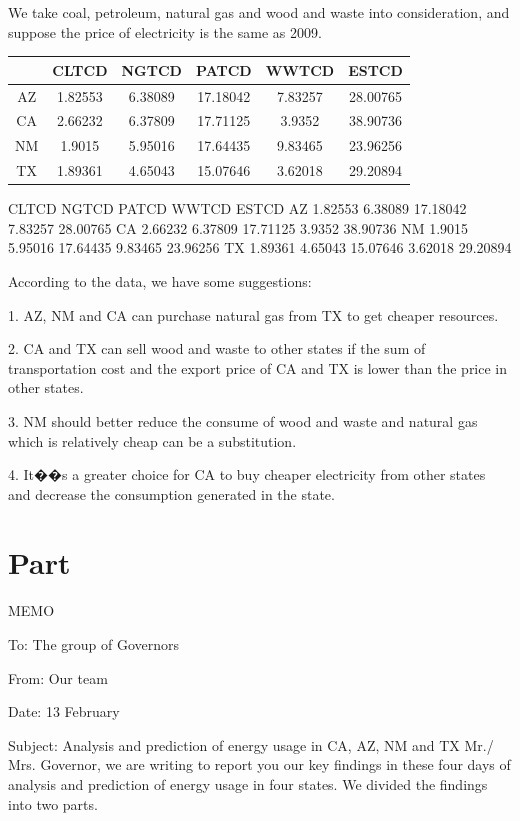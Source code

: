 \documentclass[12pt]{article}
\begin{document}
We take coal, petroleum, natural gas and wood and waste into consideration, and suppose the price of electricity is the same as 2009.


\begin{table}[!h]\centering
\begin{tabular}{|c|c|c|c|c| c|}
\hline
	&CLTCD&	NGTCD&	PATCD&	WWTCD&	ESTCD\\
\hline
AZ&	1.82553&	6.38089&	17.18042&	7.83257&	28.00765\\
\hline
CA	&2.66232&	6.37809&	17.71125&	3.9352&	38.90736\\
\hline
NM&	1.9015&	5.95016&	17.64435&	9.83465&	23.96256\\
\hline
TX&	1.89361&	4.65043&	15.07646&	3.62018&	29.20894\\

\hline
\end{tabular}
\end{table}

	CLTCD	NGTCD	PATCD	WWTCD	ESTCD
AZ	1.82553	6.38089	17.18042	7.83257	28.00765
CA	2.66232	6.37809	17.71125	3.9352	38.90736
NM	1.9015	5.95016	17.64435	9.83465	23.96256
TX	1.89361	4.65043	15.07646	3.62018	29.20894

According to the data, we have some suggestions:

1. AZ, NM and CA can purchase natural gas from TX to get cheaper resources.

2. CA and TX can sell wood and waste to other states if the sum of transportation cost and the export price of CA and TX is lower than the price in other states.

3. NM should better reduce the consume of wood and waste and natural gas which is relatively cheap can be a substitution.

4. It��s a greater choice for CA to buy cheaper electricity from other states and decrease the consumption generated in the state.


\section{Part \uppercase\expandafter{}}

MEMO

To: The group of Governors

From: Our team

Date: 13 February

Subject: Analysis and prediction of energy usage in CA, AZ, NM and TX
\newline
\newline
\indent Mr./ Mrs. Governor, we are writing to report you our key findings in these four days of analysis and prediction of energy usage in four states. We divided the findings into two parts.
\end{document}

